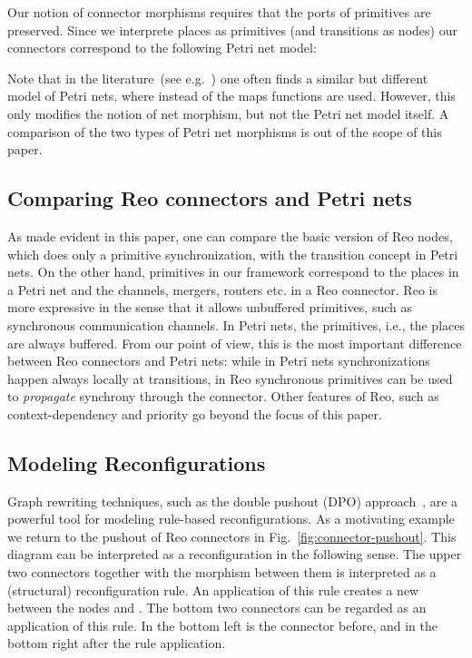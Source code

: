 \documentclass[copyright,creativecommons]{eptcs}
\begin{document}
Our notion of connector morphisms requires that the ports of primitives are preserved.
Since we interprete places as primitives (and transitions as nodes) our connectors
correspond to the following Petri net model:
\vspace{-0.2cm}

Note that in the literature~(see e.g.~\cite{PER01}) one often finds
a similar but different model of Petri nets, where instead of the maps  
functions  are used. However, this only modifies the
notion of net morphism, but not the Petri net model itself. A comparison of the
two types of Petri net morphisms is out of the scope of this paper.


\subsection{Comparing Reo connectors and Petri nets}

As made evident in this paper, one can compare the basic version of Reo nodes, which
does only a primitive synchronization, with the transition concept in Petri nets.
On the other hand, primitives in our framework correspond to the places in a Petri net
and the channels, mergers, routers etc. in a Reo connector. Reo is more expressive
in the sense that it allows unbuffered  primitives, such as synchronous communication 
channels. In Petri nets, the primitives, i.e., the places are always buffered. 
From our point of view, this is the most important difference between Reo connectors 
and Petri nets: while in Petri nets synchronizations happen always locally at transitions,
in Reo synchronous primitives can be used to \emph{propagate} synchrony through the 
connector. Other features of Reo, such as context-dependency and priority go
beyond the focus of this paper.

\subsection{Modeling Reconfigurations}

Graph rewriting techniques, such as the double pushout (DPO) approach~\cite{DPO},
are a powerful tool for modeling rule-based reconfigurations. 
As a motivating example we return to the
pushout of Reo connectors in Fig.~\ref{fig:connector-pushout}. This diagram can
be interpreted as a reconfiguration in the following sense. The upper two
connectors together with the morphism between them is interpreted as a
(structural) reconfiguration rule. An application of this rule creates a
new  between the nodes  and .
The bottom two connectors can be regarded as an application of this rule.
In the bottom left is the connector before, and in the bottom right after the
rule application.
\end{document}
